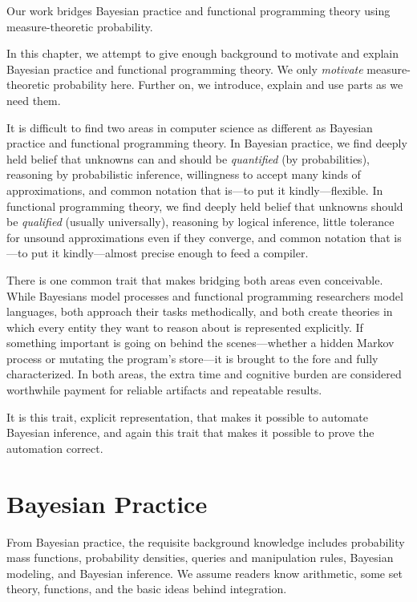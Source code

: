 Our work bridges Bayesian practice and functional programming theory using measure-theoretic probability.

In this chapter, we attempt to give enough background to motivate and explain Bayesian practice and functional programming theory.
We only \emph{motivate} measure-theoretic probability here.
Further on, we introduce, explain and use parts as we need them.

It is difficult to find two areas in computer science as different as Bayesian practice and functional programming theory.
In Bayesian practice, we find deeply held belief that unknowns can and should be \emph{quantified} (by probabilities), reasoning by probabilistic inference, willingness to accept many kinds of approximations, and common notation that is---to put it kindly---flexible.
In functional programming theory, we find deeply held belief that unknowns should be \emph{qualified} (usually universally), reasoning by logical inference, little tolerance for unsound approximations even if they converge, and common notation that is---to put it kindly---almost precise enough to feed a compiler.

There is one common trait that makes bridging both areas even conceivable.
While Bayesians model processes and functional programming researchers model languages, both approach their tasks methodically, and both create theories in which every entity they want to reason about is represented explicitly.
If something important is going on behind the scenes---whether a hidden Markov process or mutating the program's store---it is brought to the fore and fully characterized.
In both areas, the extra time and cognitive burden are considered worthwhile payment for reliable artifacts and repeatable results.

It is this trait, explicit representation, that makes it possible to automate Bayesian inference, and again this trait that makes it possible to prove the automation correct.


\section{Bayesian Practice}

From Bayesian practice, the requisite background knowledge includes probability mass functions, probability densities, queries and manipulation rules, Bayesian modeling, and Bayesian inference.
We assume readers know arithmetic, some set theory, functions, and the basic ideas behind integration.

